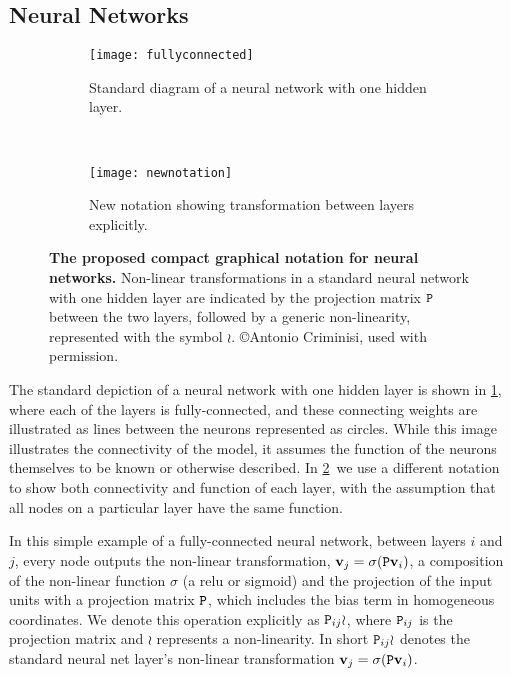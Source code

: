 \documentclass[thesis]{subfiles}
\begin{document}
	\subsection{Neural Networks}
	\begin{figure}[tbp] 
		\centering
		\begin{subfigure}[b]{0.45\textwidth}
			\centering
			\texttt{[image: fullyconnected]}
			\caption{Standard diagram of a neural network with one hidden layer.}\label{fig:oldnotation}
		\end{subfigure}
		~
		\begin{subfigure}[b]{0.45\textwidth}
			\centering
			\texttt{[image: newnotation]}
			\caption{New notation showing transformation between layers explicitly.}\label{fig:newnotation}
		\end{subfigure}
		\caption[New graphical notation for neural networks]{\textbf{The proposed compact graphical notation for neural networks.} Non-linear transformations in a standard neural network with one hidden layer are indicated by the projection matrix $\mat P$ between the two layers, followed by a generic non-linearity, represented with the symbol $\wr$. \copyright Antonio Criminisi, used with permission.}\label{fig:newGraphLanguage}
	\end{figure}
	
	The standard depiction of a neural network with one hidden layer is shown in \cref{fig:oldnotation}, where each of the layers is fully-connected, and these connecting weights are illustrated as lines between the neurons represented as circles. While this image illustrates the connectivity of the model, it assumes the function of the neurons themselves to be known or otherwise described. In \cref{fig:newnotation}\ we use a different notation to show both connectivity and function of each layer, with the assumption that all nodes on a particular layer have the same function.
	
	In this simple example of a fully-connected neural network, between layers $i$ and $j$, every node outputs the non-linear transformation, $\vec v_j = \sigma(\mat P \vec v_i)$, a composition of the non-linear function $\sigma$ (\eg a \gls{relu} or sigmoid) and the projection of the input units with a projection matrix $\mat P$, which includes the bias term in homogeneous coordinates. We denote this operation explicitly as $\mat P_{ij} \wr$, where $\mat P_{ij}$ is the projection matrix and $\wr$ represents a non-linearity. In short $\mat P_{ij} \wr$ denotes the standard neural net layer's non-linear transformation $\vec v_j = \sigma(\mat P \vec v_i)$. 
	
\end{document}
